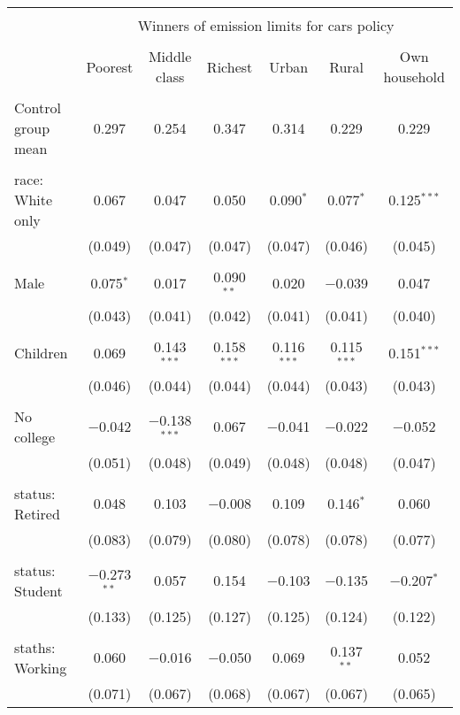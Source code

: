 
\begin{tabular}{@{\extracolsep{5pt}}lcccccc} 
\\[-1.8ex]\hline 
\hline \\[-1.8ex] 
 & \multicolumn{6}{c}{Winners of emission limits for cars policy} \\ 
\cline{2-7} 
\\[-1.8ex] & Poorest & Middle class & Richest & Urban & Rural & Own household \\ 
\hline \\[-1.8ex] 
 Control group mean & 0.297 & 0.254 & 0.347 & 0.314 & 0.229 & 0.229  \\ \hline \\[-1.8ex] race: White only & 0.067 & 0.047 & 0.050 & 0.090$^{*}$ & 0.077$^{*}$ & 0.125$^{***}$ \\ 
  & (0.049) & (0.047) & (0.047) & (0.047) & (0.046) & (0.045) \\ 
  & & & & & & \\ 
 Male & 0.075$^{*}$ & 0.017 & 0.090$^{**}$ & 0.020 & $-$0.039 & 0.047 \\ 
  & (0.043) & (0.041) & (0.042) & (0.041) & (0.041) & (0.040) \\ 
  & & & & & & \\ 
 Children & 0.069 & 0.143$^{***}$ & 0.158$^{***}$ & 0.116$^{***}$ & 0.115$^{***}$ & 0.151$^{***}$ \\ 
  & (0.046) & (0.044) & (0.044) & (0.044) & (0.043) & (0.043) \\ 
  & & & & & & \\ 
 No college & $-$0.042 & $-$0.138$^{***}$ & 0.067 & $-$0.041 & $-$0.022 & $-$0.052 \\ 
  & (0.051) & (0.048) & (0.049) & (0.048) & (0.048) & (0.047) \\ 
  & & & & & & \\ 
 status: Retired & 0.048 & 0.103 & $-$0.008 & 0.109 & 0.146$^{*}$ & 0.060 \\ 
  & (0.083) & (0.079) & (0.080) & (0.078) & (0.078) & (0.077) \\ 
  & & & & & & \\ 
 status: Student & $-$0.273$^{**}$ & 0.057 & 0.154 & $-$0.103 & $-$0.135 & $-$0.207$^{*}$ \\ 
  & (0.133) & (0.125) & (0.127) & (0.125) & (0.124) & (0.122) \\ 
  & & & & & & \\ 
 staths: Working & 0.060 & $-$0.016 & $-$0.050 & 0.069 & 0.137$^{**}$ & 0.052 \\ 
  & (0.071) & (0.067) & (0.068) & (0.067) & (0.067) & (0.065) \\ 

\end{tabular}
